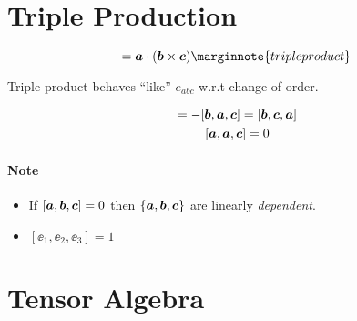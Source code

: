 
\section{Triple Production}

\begin{equation}
  [ \mb{a}, \mb{b}, \mb{c} ] = \mb{a} \cdot (\mb{b} \crossprod \mb{c})
  \marginnote{triple product}
  \label{eq:triple_product}
\end{equation}

Triple product behaves ``like'' \(e_{abc}\) w.r.t change of order.
\begin{example}
  \vspace{-2ex}
  \begin{gather*}
    [ \mb{a}, \mb{b}, \mb{c} ] = - [ \mb{b}, \mb{a}, \mb{c} ] = [ \mb{b}, \mb{c}, \mb{a} ] \\
    [ \mb{a}, \mb{a}, \mb{c} ] = 0
  \end{gather*}
\end{example}

\paragraph{Note}
\begin{itemize}
  \item If \([ \bm{a}, \bm{b}, \bm{c} ] = 0\) then \(\{\bm{a}, \bm{b}, \bm{c}\}\) are linearly \emph{dependent}.
  \item \([ \ee_{1}, \ee_{2}, \ee_{3} ] = 1\)
\end{itemize}



\section{Tensor Algebra}

